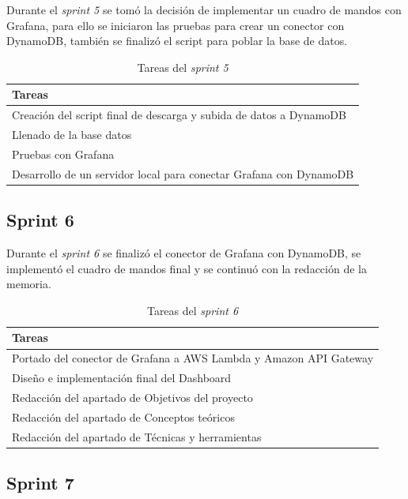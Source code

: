 Durante el \textit{sprint 5} se tomó la decisión de implementar un cuadro de mandos con Grafana, para ello se iniciaron las pruebas para crear un conector con DynamoDB, también se finalizó el script para poblar la base de datos.

\begin{table}[H]
    \centering
    \begin{tabular}{l}
    \hline
    \textbf{Tareas} \\ \hline
    Creación del script final de descarga y subida de datos a DynamoDB \\
    Llenado de la base datos \\
    Pruebas con Grafana \\
    Desarrollo de un servidor local para conectar Grafana con DynamoDB \\ \hline
    \end{tabular}
    \caption{Tareas del \textit{sprint 5}}
    \label{tab:tasks_sprint5}
\end{table}

\subsection{Sprint 6}

Durante el \textit{sprint 6} se finalizó el conector de Grafana con DynamoDB, se implementó el cuadro de mandos final y se continuó con la redacción de la memoria.

\begin{table}[H]
    \centering
    \begin{tabular}{l}
    \hline
    \textbf{Tareas} \\ \hline
    Portado del conector de Grafana a AWS Lambda y Amazon API Gateway \\
    Diseño e implementación final del Dashboard \\
    Redacción del apartado de Objetivos del proyecto \\
    Redacción del apartado de Conceptos teóricos \\
    Redacción del apartado de Técnicas y herramientas \\ \hline
    \end{tabular}
    \caption{Tareas del \textit{sprint 6}}
    \label{tab:tasks_sprint6}
\end{table}

\subsection{Sprint 7}

